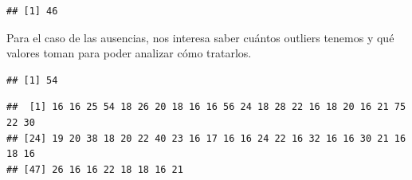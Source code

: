 \documentclass[]{article}
\newenvironment{Shaded}{\begin{snugshade}}{\end{snugshade}}
\newcommand{\DecValTok}[1]{\textcolor[rgb]{0.86,0.86,0.80}{#1}}
\newcommand{\KeywordTok}[1]{\textcolor[rgb]{0.94,0.87,0.69}{#1}}
\newcommand{\NormalTok}[1]{\textcolor[rgb]{0.80,0.80,0.80}{#1}}
\newcommand{\OperatorTok}[1]{\textcolor[rgb]{0.94,0.94,0.82}{#1}}
\newcommand{\StringTok}[1]{\textcolor[rgb]{0.80,0.58,0.58}{#1}}
\begin{document}
\begin{verbatim}
## [1] 46
\end{verbatim}

Para el caso de las ausencias, nos interesa saber cuántos outliers
tenemos y qué valores toman para poder analizar cómo tratarlos.

\begin{Shaded}
\end{Shaded}

\begin{verbatim}
## [1] 54
\end{verbatim}

\begin{Shaded}
\end{Shaded}

\begin{verbatim}
##  [1] 16 16 25 54 18 26 20 18 16 16 56 24 18 28 22 16 18 20 16 21 75 22 30
## [24] 19 20 38 18 20 22 40 23 16 17 16 16 24 22 16 32 16 16 30 21 16 18 16
## [47] 26 16 16 22 18 18 16 21
\end{verbatim}

\begin{Shaded}
\end{Shaded}
\end{document}
